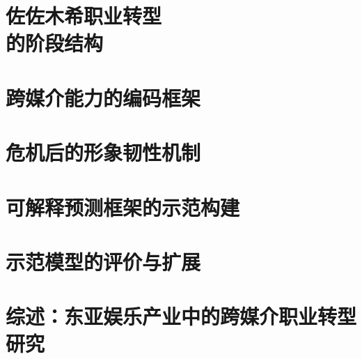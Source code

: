\documentclass[UTF8,12pt,twoside,a4paper,AutoFakeBold]{ctexart}
\begin{document}

\clearpage{\pagestyle{empty}\cleardoublepage}


\clearpage{\pagestyle{empty}\cleardoublepage}

\setcounter{page}{1}


\clearpage

\clearpage{\pagestyle{empty}\cleardoublepage}

\tableofcontents
\clearpage{\pagestyle{empty}\cleardoublepage}
\mbox{}

\setcounter{page}{1}

\section[佐佐木希职业转型的阶段结构]{佐佐木希职业转型\\的阶段结构}

\clearpage{\pagestyle{empty}\cleardoublepage}

\section{跨媒介能力的编码框架}

\clearpage{\pagestyle{empty}\cleardoublepage}

\section{危机后的形象韧性机制}

\clearpage{\cleardoublepage}

\section{可解释预测框架的示范构建}

\clearpage{\cleardoublepage}

\section{示范模型的评价与扩展}

\clearpage{\cleardoublepage}

\section{综\hspace{0.5em}述：东亚娱乐产业中的跨媒介职业转型研究}

\clearpage{\cleardoublepage}
\end{document}
